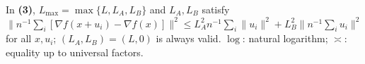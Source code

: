 \begin{table}[tp]
\begin{threeparttable}
\begin{tablenotes}[flushleft]
In \textbf{(3)}, $L_{\max}=\max\{L,L_A,L_B\}$ and $L_A,L_B$ satisfy
$\|n^{-1}\sum_i[\nabla f(x+u_i)-\nabla f(x)]\|^2\le L_A^2n^{-1}\sum_i\|u_i\|^2+L_B^2\|n^{-1}\sum_i u_i\|^2$ for all $x,u_i$;
$(L_A,L_B)=(L,0)$ is always valid. $\log$: natural logarithm; $\asymp$: equality up to universal factors.
\end{tablenotes}
\end{threeparttable}
\end{table}
\clearpage
